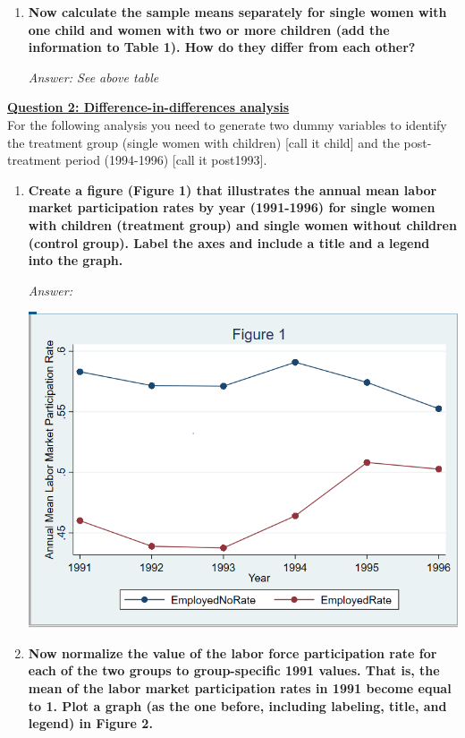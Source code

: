 \documentclass{article}
\begin{document}
\begin{enumerate}
\item \textbf{Now calculate the sample means separately for single women with one child and women with two or more children (add the information to Table 1). How do they differ from each other?}

\textit{Answer: See above table }

\end{enumerate}


\textbf{\underline{Question 2: Difference-in-differences analysis}}\\

\bigskip
For the following analysis you need to generate two dummy variables to identify the treatment group (single women with children) [call it child] and the post-treatment period (1994-1996) [call it post1993].


\begin{enumerate}
	
	\item \textbf{Create a figure (Figure 1) that illustrates the annual mean labor market participation rates by year (1991-1996) for single women with children (treatment group) and single women without children (control group). Label the axes and include a title and a legend into the graph.}

\textit{Answer: }

\includegraphics[width = \textwidth]{Figure 1.png}



\item \textbf{Now normalize the value of the labor force participation rate for each of the two groups to group-specific 1991 values. That is, the mean of the labor market participation rates in 1991 become equal to 1. Plot a graph (as the one before, including labeling, title, and legend) in Figure 2.}


\end{enumerate}
\end{document}
